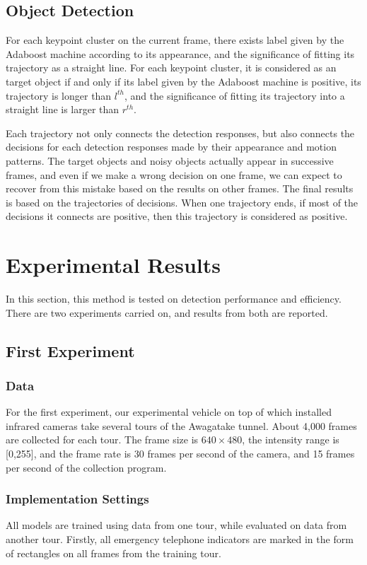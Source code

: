 \subsection{Object Detection}
For each keypoint cluster on the current frame, there exists label given by the Adaboost machine according to its appearance, and the significance of fitting its trajectory as a straight line.  For each keypoint cluster, it is considered as an target object if and only if its label given by the Adaboost machine is positive, its trajectory is longer than $l^{th}$, and the significance of fitting its trajectory into a straight line is larger than $r^{th}$.

Each trajectory not only connects the detection responses, but also connects the decisions for each detection responses made by their appearance and motion patterns. The target objects and noisy objects actually appear in successive frames, and even if we make a wrong decision on one frame, we can expect to recover from this mistake based on the results on other frames. The final results is based on the trajectories of decisions. When one trajectory ends, if most of the decisions it connects are positive, then this trajectory is considered as positive.



\section{Experimental Results}
\label{exp}
In this section, this method is tested on detection performance and efficiency. There are two experiments carried on, and results from both are reported.

\subsection{First Experiment}

\subsubsection{Data} For the first experiment, our experimental vehicle on top of which installed infrared cameras take several tours of the Awagatake tunnel. About 4,000 frames are collected for each tour. The frame size is $640\times 480$, the intensity range is [0,255], and the frame rate is 30 frames per second of the camera, and 15 frames per second of the collection program.

\subsubsection{Implementation Settings} All models are trained using data from one tour, while evaluated on data from another tour. Firstly, all emergency telephone indicators are marked in the form of rectangles on all frames from the training tour.

